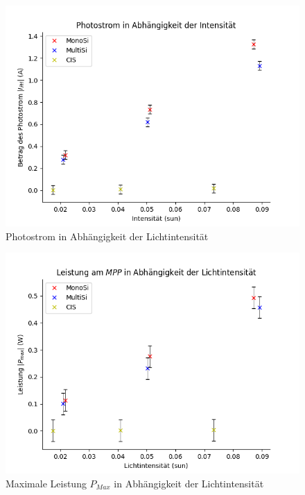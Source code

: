 \begin{figure}[ht]
    \centering
    \includegraphics[width = \linewidth]{Bilder/PlotPhotostromInt.png}
    \caption{Photostrom in Abhängigkeit der Lichtintensität}

\end{figure}

\begin{figure}[ht]
    \centering
    \includegraphics[width = \linewidth]{Bilder/PlotPMAXInt.png}
    \caption{Maximale Leistung $P_{Max}$ in Abhängigkeit der Lichtintensität}  
\end{figure}

